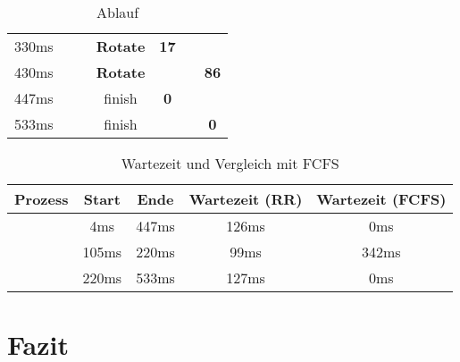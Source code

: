 \documentclass{article}
\begin{document}
\begin{table}[!h]
\begin{tabular}{c|cc|c|ccc}
        330ms                                   & \PTwo{}                                         & \PZero{}        & \textbf{Rotate}                & \textbf{17}                           &                  &                  \\
        430ms                                   & \PZero{}                                        & \PTwo{}         & \textbf{Rotate}                &                                       &                  & \textbf{86}      \\
        447ms                                   & \PTwo{}                                         &                 & \PZero{} finish                & \textbf{0}                            &                  &                  \\
        533ms                                   &                                                 &                 & \PTwo{} finish                 &                                       &                  & \textbf{0}
    \end{tabular}
    \caption{Ablauf}
\end{table}

\begin{table}[!h]
    \centering
    \begin{tabular}{c|c|c|c|c}
        \textbf{Prozess} & \textbf{Start} & \textbf{Ende} & \textbf{Wartezeit (RR)} & \textbf{Wartezeit (FCFS)} \\
        \hline
        \PZero{}         & 4ms            & 447ms         & 126ms                   & 0ms                       \\
        \POne{}          & 105ms          & 220ms         & 99ms                    & 342ms                     \\
        \PTwo{}          & 220ms          & 533ms         & 127ms                   & 0ms
    \end{tabular}
    \caption{Wartezeit und Vergleich mit FCFS}
\end{table}

\pagebreak

\section{Fazit}
\end{document}
